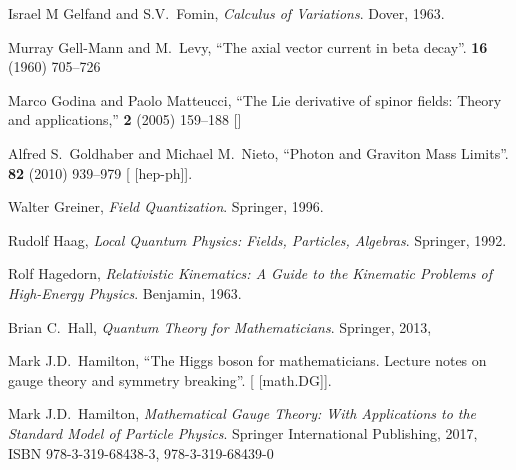 \begin{thebibliography}{99}
Israel M Gelfand and S.V.~Fomin,
\textit{Calculus of Variations}.
Dover, 1963.

Murray Gell-Mann and M.~Levy,
``The axial vector current in beta decay''.
 \textbf{16} (1960) 705--726
{\tt{}}

Marco Godina and Paolo Matteucci,
``The Lie derivative of spinor fields: Theory and applications,''
 \textbf{2} (2005) 159--188
{\tt{}}
[]

Alfred S.~Goldhaber and Michael M.~Nieto,
``Photon and Graviton Mass Limits''.
 \textbf{82} (2010) 939--979
{\tt{}}
[ [hep-ph]].
\usesOurConventions

Walter Greiner,
\textit{Field Quantization}.
Springer, 1996.


Rudolf Haag,
\textit{Local Quantum Physics: Fields, Particles, Algebras}.
Springer, 1992.

Rolf Hagedorn,
\textit{Relativistic Kinematics: A Guide to the Kinematic Problems of High-Energy Physics}.
Benjamin, 1963.

Brian C.~Hall,
\textit{Quantum Theory for Mathematicians}.
Springer, 2013,
{\tt{}}

Mark J.D.\ Hamilton,
``The Higgs boson for mathematicians. Lecture notes on gauge theory and symmetry breaking''.
[ [math.DG]].

Mark J.D.\ Hamilton,
\textit{Mathematical Gauge Theory: With Applications to the Standard Model of Particle Physics}.
Springer International Publishing, 2017,
ISBN 978-3-319-68438-3, 978-3-319-68439-0
{\tt{}}


\end{thebibliography}
